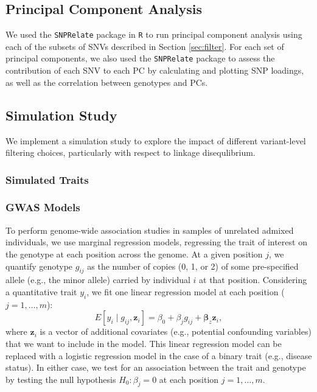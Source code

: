 \documentclass[12pt]{article}
\begin{document}
\subsection{Principal Component Analysis}
\label{sec:PCA}

We used the \texttt{SNPRelate} package in \texttt{R} to run principal component analysis using each of the subsets of SNVs described in Section \ref{sec:filter}. 
For each set of principal components, we also used the \texttt{SNPRelate} package to assess the contribution of each SNV to each PC by calculating and plotting SNP loadings, as well as the correlation between genotypes and PCs.


\subsection{Simulation Study}

We implement a simulation study to explore the impact of different variant-level filtering choices, particularly with respect to linkage disequlibrium. 

\subsubsection{Simulated Traits}


\subsubsection{GWAS Models}

To perform genome-wide association studies in samples of unrelated admixed individuals, we use marginal regression models, regressing the trait of interest on the genotype at each position across the genome. 
At a given position $j$, we quantify genotype $g_{ij}$ as the number of copies (0, 1, or 2) of some pre-specified allele (e.g., the minor allele) carried by individual $i$ at that position. 
Considering a quantitative trait $y_i$, we fit one linear regression model at each position ($j = 1, \dots, m$): $$E[y_i \mid g_{ij}, \mathbf{z}_i] = \beta_0 + \beta_j g_{ij} + \boldsymbol{\beta}_z \mathbf{z}_i,$$ where $\mathbf{z}_i$ is a vector of additional covariates (e.g., potential confounding variables) that we want to include in the model.
This linear regression model can be replaced with a logistic regression model in the case of a binary trait (e.g., disease status).
In either case, we test for an association between the trait and genotype by testing the null hypothesis $H_0: \beta_j = 0$ at each position $j = 1, \dots, m$.
\end{document}
